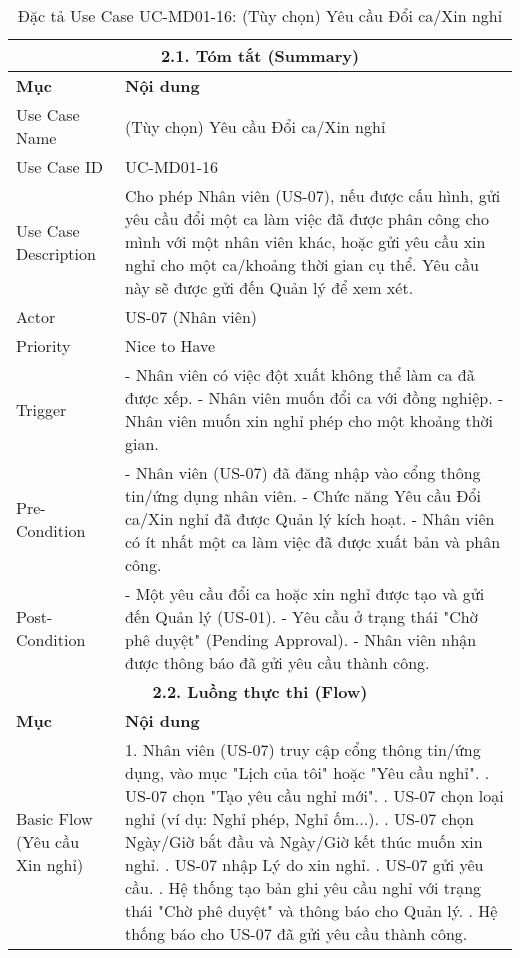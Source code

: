 \begin{longtable}{|m{4cm}|p{11cm}|}
\caption{Đặc tả Use Case UC-MD01-16: (Tùy chọn) Yêu cầu Đổi ca/Xin nghỉ} \label{tab:uc_md01_16_revised} \\
\hline
\multicolumn{2}{|c|}{\textbf{2.1. Tóm tắt (Summary)}} \\
\hline
\textbf{Mục} & \textbf{Nội dung} \\
\hline
\endhead %
\hline
\endfoot %
\hline
\endlastfoot %
Use Case Name & (Tùy chọn) Yêu cầu Đổi ca/Xin nghỉ \\
\hline
Use Case ID & UC-MD01-16 \\
\hline
Use Case Description & Cho phép Nhân viên (US-07), nếu được cấu hình, gửi yêu cầu đổi một ca làm việc đã được phân công cho mình với một nhân viên khác, hoặc gửi yêu cầu xin nghỉ cho một ca/khoảng thời gian cụ thể. Yêu cầu này sẽ được gửi đến Quản lý để xem xét. \\
\hline
Actor & US-07 (Nhân viên) \\
\hline
Priority & Nice to Have \\
\hline
Trigger & - Nhân viên có việc đột xuất không thể làm ca đã được xếp. \newline - Nhân viên muốn đổi ca với đồng nghiệp. \newline - Nhân viên muốn xin nghỉ phép cho một khoảng thời gian. \\
\hline
Pre-Condition & - Nhân viên (US-07) đã đăng nhập vào cổng thông tin/ứng dụng nhân viên. \newline - Chức năng Yêu cầu Đổi ca/Xin nghỉ đã được Quản lý kích hoạt. \newline - Nhân viên có ít nhất một ca làm việc đã được xuất bản và phân công. \\
\hline
Post-Condition & - Một yêu cầu đổi ca hoặc xin nghỉ được tạo và gửi đến Quản lý (US-01). \newline - Yêu cầu ở trạng thái "Chờ phê duyệt" (Pending Approval). \newline - Nhân viên nhận được thông báo đã gửi yêu cầu thành công. \\
\hline
\multicolumn{2}{|c|}{\textbf{2.2. Luồng thực thi (Flow)}} \\
\hline
\textbf{Mục} & \textbf{Nội dung} \\
\hline
Basic Flow (Yêu cầu Xin nghỉ) & 1. Nhân viên (US-07) truy cập cổng thông tin/ứng dụng, vào mục "Lịch của tôi" hoặc "Yêu cầu nghỉ". \newline 2. US-07 chọn "Tạo yêu cầu nghỉ mới". \newline 3. US-07 chọn loại nghỉ (ví dụ: Nghỉ phép, Nghỉ ốm...). \newline 4. US-07 chọn Ngày/Giờ bắt đầu và Ngày/Giờ kết thúc muốn xin nghỉ. \newline 5. US-07 nhập Lý do xin nghỉ. \newline 6. US-07 gửi yêu cầu. \newline 7. Hệ thống tạo bản ghi yêu cầu nghỉ với trạng thái "Chờ phê duyệt" và thông báo cho Quản lý. \newline 8. Hệ thống báo cho US-07 đã gửi yêu cầu thành công. \\

\end{longtable}
